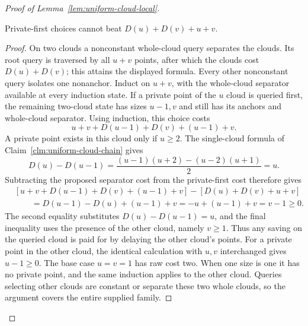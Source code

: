 \begin{proof}[Proof of Lemma~\ref{lem:uniform-cloud-local}]
\begin{claim}
\label{clm:uniform-cloud-separator}
Private-first choices cannot beat $D(u)+D(v)+u+v$.
\end{claim}
\begin{proof}
On two clouds a nonconstant whole-cloud query separates the
clouds. Its root query is traversed by all $u+v$ points, after which
the clouds cost $D(u)+D(v)$; this attains the displayed formula.
Every other nonconstant query isolates one nonanchor. Induct on
$u+v$, with the whole-cloud separator available at every induction
state.
If a private point of the $u$ cloud is queried first, the
remaining two-cloud state has sizes $u-1,v$ and still has its
anchors and whole-cloud separator. Using induction, this choice
costs
\[
 u+v+D(u-1)+D(v)+(u-1)+v.
\]
A private point exists in this cloud only if $u\ge2$. The
single-cloud formula of Claim~\ref{clm:uniform-cloud-chain} gives
\[
 D(u)-D(u-1)
 =\frac{(u-1)(u+2)-(u-2)(u+1)}2=u.
\]
Subtracting the proposed separator cost from the private-first cost
therefore gives
\begin{align*}
 &[u+v+D(u-1)+D(v)+(u-1)+v]
       -[D(u)+D(v)+u+v]\\
 &\qquad=D(u-1)-D(u)+(u-1)+v
          =-u+(u-1)+v=v-1\ge0.
\end{align*}
The second equality substitutes $D(u)-D(u-1)=u$, and the final
inequality uses the presence of the other cloud, namely $v\ge1$.
Thus any saving on the queried cloud is paid for by delaying the
other cloud's points.
For a private point in the other cloud, the identical calculation
with $u,v$ interchanged gives $u-1\ge0$. The base case $u=v=1$ has raw cost two.
When one size is one it has no private point, and the same
induction applies to the other cloud. Queries selecting other
clouds are constant or separate these two whole clouds, so the
argument covers the entire supplied family.
\end{proof}
\end{proof}


